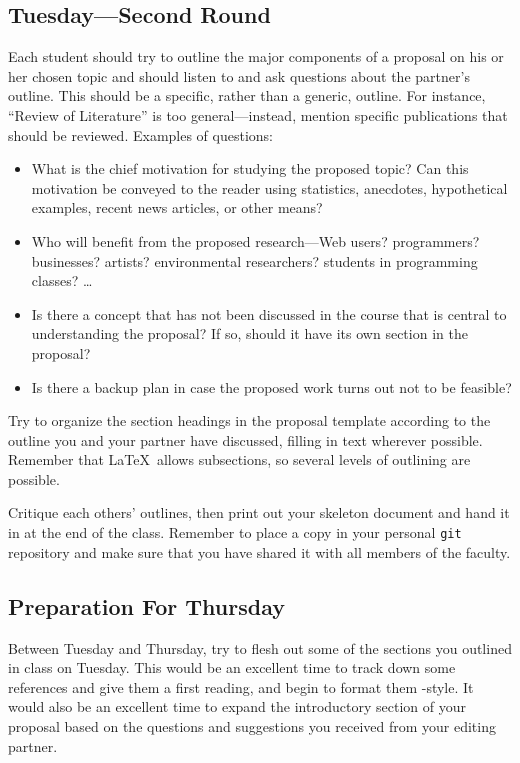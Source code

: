 \subsection*{Tuesday---Second Round}
 Each student should try to outline the major 
components of a proposal on his or her chosen topic and should listen to
and ask questions about the partner's outline. This should be a
specific, rather than a generic, outline. For instance, ``Review of
Literature'' is too general---instead, mention specific publications
that should be reviewed. Examples of questions:
\begin{itemize}
\item
What is the chief motivation for studying the proposed topic? Can this
motivation be conveyed to the reader using statistics, anecdotes, hypothetical
examples, recent news articles, or other means?
\item
Who will benefit from the proposed research---Web users? programmers?
businesses? artists? environmental researchers? students in programming classes?
\ldots
\item
Is there a concept that has not been discussed in the course that is central
to understanding the proposal? If so, should it have its own section in the
proposal?
\item
Is there a backup plan in case the proposed work turns out not to be feasible?
\end{itemize}

 Try to organize the section headings in the proposal template
according to the outline you and your partner have discussed, filling in text
wherever possible. Remember that \LaTeX\ allows subsections, so several
levels of outlining are possible.

 Critique each others' outlines, then print out your
skeleton document and hand it in at the end of the class. Remember to place a
copy in your personal {\tt git} repository and make sure that you have shared it
with all members of the faculty.

\subsection*{Preparation For Thursday}
Between Tuesday and Thursday, try to flesh out some of the sections you
outlined in class on Tuesday. This would be an excellent time to track down
some references and give them a first reading, 
and begin to format them \BibTeX-style. It would also be an excellent time to
expand the introductory section of your proposal based on the questions and
suggestions you received from your editing partner.


